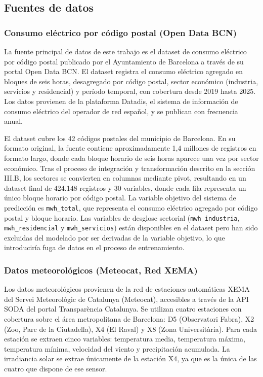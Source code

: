 \documentclass[12pt, a4paper]{article}
\begin{document}
\subsection{Fuentes de datos}


\subsubsection{Consumo eléctrico por código postal (Open Data BCN)}


La fuente principal de datos de este trabajo es el dataset de consumo eléctrico por código postal publicado por el Ayuntamiento de Barcelona a través de su portal Open Data BCN. El dataset registra el consumo eléctrico agregado en bloques de seis horas, desagregado por código postal, sector económico (industria, servicios y residencial) y período temporal, con cobertura desde 2019 hasta 2025. Los datos provienen de la plataforma Datadis, el sistema de información de consumo eléctrico del operador de red español, y se publican con frecuencia anual.

El dataset cubre los 42 códigos postales del municipio de Barcelona. En su formato original, la fuente contiene aproximadamente 1,4 millones de registros en formato largo, donde cada bloque horario de seis horas aparece una vez por sector económico. Tras el proceso de integración y transformación descrito en la sección III.B, los sectores se convierten en columnas mediante pivot, resultando en un dataset final de 424.148 registros y 30 variables, donde cada fila representa un único bloque horario por código postal. La variable objetivo del sistema de predicción es \texttt{mwh\_total}, que representa el consumo eléctrico agregado por código postal y bloque horario. Las variables de desglose sectorial (\texttt{mwh\_industria}, \texttt{mwh\_residencial} y \texttt{mwh\_servicios}) están disponibles en el dataset pero han sido excluidas del modelado por ser derivadas de la variable objetivo, lo que introduciría fuga de datos en el proceso de entrenamiento.

\subsubsection{Datos meteorológicos (Meteocat, Red XEMA)}


Los datos meteorológicos provienen de la red de estaciones automáticas XEMA del Servei Meteorològic de Catalunya (Meteocat), accesibles a través de la API SODA del portal Transparència Catalunya. Se utilizan cuatro estaciones con cobertura sobre el área metropolitana de Barcelona: D5 (Observatori Fabra), X2 (Zoo, Parc de la Ciutadella), X4 (El Raval) y X8 (Zona Universitària). Para cada estación se extraen cinco variables: temperatura media, temperatura máxima, temperatura mínima, velocidad del viento y precipitación acumulada. La irradiancia solar se extrae únicamente de la estación X4, ya que es la única de las cuatro que dispone de ese sensor.
\end{document}
